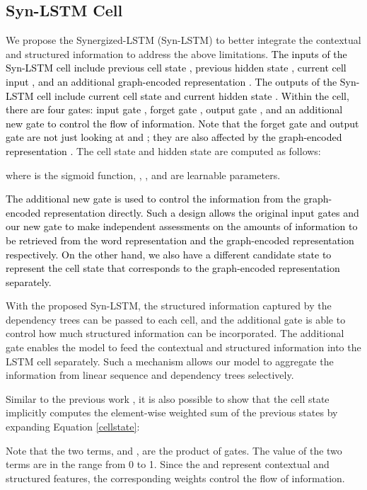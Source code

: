 \documentclass[11pt]{article}
\begin{document}
\subsection{Syn-LSTM Cell}
We propose the Synergized-LSTM (Syn-LSTM) to better integrate  the contextual and structured information to address the above limitations. 
\textcolor{black}{
The inputs of the Syn-LSTM cell include previous cell state , previous hidden state , current cell input , and an additional graph-encoded representation  . The outputs of the Syn-LSTM cell include current cell state  and current hidden state . Within the cell, there are four gates: input gate , forget gate , output gate , and an additional new gate   to control the flow of information.
Note that the forget gate  and output gate  are not just looking at  and ; they are also affected by the graph-encoded representation . 
}
The cell state  and hidden state  are computed as follows:

where  is the sigmoid function, , ,  and  are learnable parameters.

\textcolor{black}{
The additional new gate  is used to  control the information from the graph-encoded representation directly. 
Such a design allows the original input gates  and our new gate  to make independent assessments on the amounts of information to be retrieved from the word representation  and the graph-encoded representation  respectively.
On the other hand, we also have a different candidate state  to represent the cell state that corresponds to the graph-encoded representation separately.
}

With the proposed Syn-LSTM, 
the structured information captured by the dependency trees can be passed to each cell,
and the additional gate  is able to control how much structured information can be incorporated.
The additional gate enables the model to feed the contextual and structured information into the LSTM cell separately. 
Such a mechanism allows our model to aggregate the information from linear sequence and dependency trees selectively.

Similar to the previous work \cite{levy-etal-2018-long}, it is also possible to show that the cell state    implicitly computes the element-wise weighted sum of the previous states by expanding Equation \ref{cellstate}:


Note that the two terms,  and  , are the product of gates. The value of the two terms are in the range from 0 to 1.
Since the  and  represent contextual and structured features, the corresponding weights control the flow of information.
\end{document}
